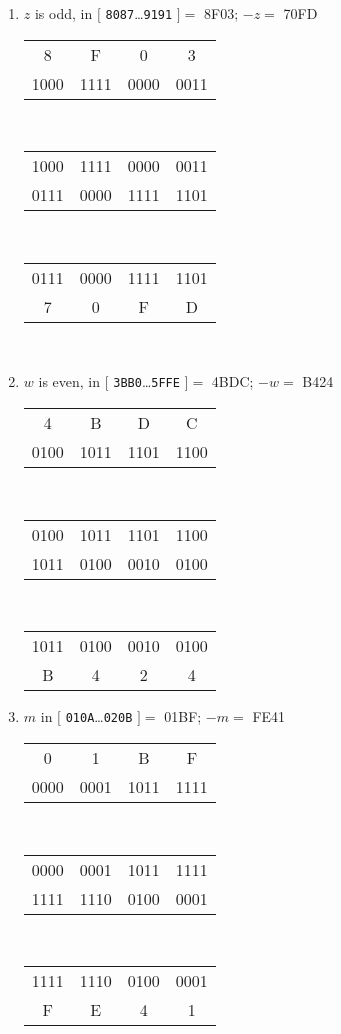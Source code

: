 \documentclass[11pt]{article}
\begin{document}
\begin{enumerate}
\item \(z\) is odd, in \([\) \texttt{8087}\ldots\texttt{9191} \(]  =\) 8F03;
      \(-z = \) 70FD
      
\begin{tabular}{c c c c}
8&F&0&3\\
1000&1111&0000&0011
\end{tabular}\\[2pt]

\begin{tabular}{c c c c}
1000&1111&0000&0011\\
0111&0000&1111&1101
\end{tabular}\\[2pt]

\begin{tabular}{c c c c}
0111&0000&1111&1101\\
7&0&F&D
\end{tabular}\\[2pt]


\item \(w\) is even, in \([\) \texttt{3BB0}\ldots\texttt{5FFE} \(]  =\) 4BDC;
      \(-w = \) B424

\begin{tabular}{c c c c}
4&B&D&C\\
0100&1011&1101&1100
\end{tabular}\\[2pt]

\begin{tabular}{c c c c}
0100&1011&1101&1100\\
1011&0100&0010&0100
\end{tabular}\\[2pt]

\begin{tabular}{c c c c}
1011&0100&0010&0100\\
B&4&2&4
\end{tabular}

\item \(m\) in \([\) \texttt{010A}\ldots\texttt{020B} \(]  =\) 01BF;
      \(-m = \) FE41

\begin{tabular}{c c c c}
0&1&B&F\\
0000&0001&1011&1111
\end{tabular}\\[2pt]

\begin{tabular}{c c c c}
0000&0001&1011&1111\\
1111&1110&0100&0001
\end{tabular}\\[2pt]

\begin{tabular}{c c c c}
1111&1110&0100&0001\\
F&E&4&1
\end{tabular}
\end{enumerate}
\end{document}
